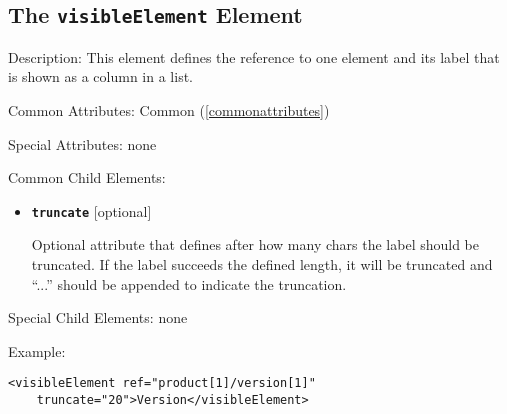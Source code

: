 \subsection{ The \texttt{visibleElement} Element}
\label{visibleElement}
\begin{description}
 \item Description: This element defines the reference to one element and its label that is shown as a column in a list.

 \item Common Attributes: Common (\ref{commonattributes})

 \item Special Attributes: none

 \item Common Child Elements:

\begin{itemize}
 \item \textbf{\texttt{truncate}} [optional]

Optional attribute that defines after how many chars the label should be truncated. If the label succeeds the defined length, it will be truncated and ``...'' should be appended to indicate the truncation.
\end{itemize}

 \item Special Child Elements: none

 \item Example: 

\begin{lstlisting}[caption=\texttt{visibleElement} Element]
<visibleElement ref="product[1]/version[1]" 
    truncate="20">Version</visibleElement>
\end{lstlisting}
\end{description}





